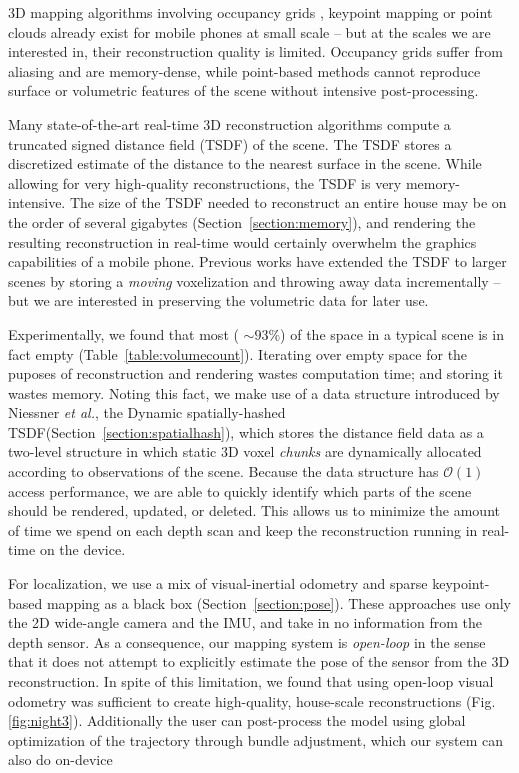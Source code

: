 \documentclass[conference]{IEEEtran}
\newcommand{\sref}[1]{Section~\ref{#1}}
\newcommand{\figref}[1]{Fig.\ref{#1}}
\newcommand{\tabref}[1]{Table~\ref{#1}}
\newcommand{\etal}{\textit{et al.}\xspace}
\newcommand{\TSDF}{TSDF\xspace}
\begin{document}
3D mapping algorithms involving occupancy grids \cite{Elfes1989}, keypoint
mapping \cite{KleinSparse} or point clouds \cite{RusinkiewiczPoints,
TanskanenMetric, WeiseScanning} already exist for mobile phones at small scale
-- but at the scales we are interested in, their reconstruction quality is
limited. Occupancy grids suffer from aliasing and are memory-dense, while
point-based methods cannot reproduce surface or volumetric features of the scene
without intensive post-processing.

Many state-of-the-art real-time 3D reconstruction algorithms \cite{Newcombe,
Whelan2013,WhelanLoopClose,Bylow2013,NiessnerHashing} compute a truncated
signed distance field (\TSDF) \cite{Curless1996} of the scene. The \TSDF stores a
discretized estimate of the distance to the nearest surface in the scene. While
allowing for very high-quality reconstructions, the \TSDF is very
memory-intensive. The size of the \TSDF needed to reconstruct an entire house
may be on the order of several gigabytes  (\sref{section:memory}), and
rendering the resulting reconstruction in real-time would certainly overwhelm
the graphics capabilities of a mobile phone. Previous works \cite{Whelan2013,
WhelanLoopClose} have extended the \TSDF to larger scenes by storing a
\textit{moving} voxelization and throwing away data incrementally -- but we are
interested in preserving the volumetric data for later use.

Experimentally, we found that most ( $\sim 93\%$) of the space in a typical
scene is in fact empty (\tabref{table:volumecount}). Iterating over empty space
for the puposes of reconstruction and rendering wastes computation time; and storing it
wastes memory. Noting this fact, we make use of a data structure introduced by
Niessner \etal \cite{NiessnerHashing}, the Dynamic spatially-hashed
\cite{SpatialHashing} \TSDF (\sref{section:spatialhash}), which stores the
distance field data as a two-level structure in which static 3D voxel
\textit{chunks} are dynamically allocated according to observations
of the scene. Because the data structure has $\mathcal{O}(1)$ access
performance, we are able to quickly identify which parts of the scene should be
rendered, updated, or deleted. This allows us to minimize the amount of time we
spend on each depth scan and keep the reconstruction running in real-time on the device.

For localization, we use a mix of  visual-inertial odometry \cite{VINS, VINS2}
and sparse keypoint-based mapping \cite{FastSlam} as a black box
(\sref{section:pose}). These approaches use only the 2D wide-angle camera and
the IMU, and take in no information from the depth sensor. As a consequence,
our mapping system  is \textit{open-loop} in the sense that it does not attempt
to explicitly estimate the pose of the sensor from the 3D reconstruction. In spite
of this limitation, we found that using  open-loop visual odometry was
sufficient to create high-quality, house-scale reconstructions
(\figref{fig:night3}). Additionally  the user can post-process the model using
global optimization of the trajectory through bundle adjustment, which our
system can also do on-device
\end{document}
